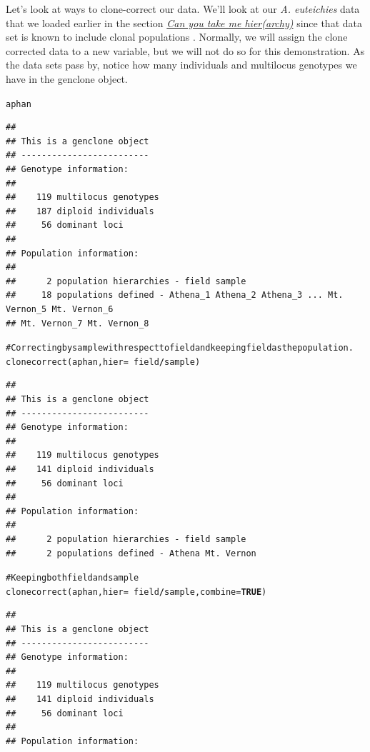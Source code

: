 \documentclass[letterpaper]{article}\usepackage[]{graphicx}\usepackage[]{color}
\makeatletter
\newcommand{\hlnum}[1]{\textcolor[rgb]{0.502,0,0.502}{\textbf{#1}}}%
\newcommand{\hlcom}[1]{\textcolor[rgb]{1,0.502,0}{#1}}%
\newcommand{\hlopt}[1]{\textcolor[rgb]{1,0,0.502}{\textbf{#1}}}%
\newcommand{\hlstd}[1]{\textcolor[rgb]{0,0,0}{#1}}%
\newcommand{\hlkwc}[1]{\textcolor[rgb]{0,0.502,0.753}{#1}}%
\newcommand{\hlkwd}[1]{\textcolor[rgb]{0,0.267,0.4}{#1}}%
\newenvironment{kframe}{%
 \def\at@end@of@kframe{}%
 \ifinner\ifhmode%
  \def\at@end@of@kframe{\end{minipage}}%
  \begin{minipage}{\columnwidth}%
 \fi\fi%
 \def\FrameCommand##1{\hskip\@totalleftmargin \hskip-\fboxsep
 \colorbox{shadecolor}{##1}\hskip-\fboxsep
     \hskip-\linewidth \hskip-\@totalleftmargin \hskip\columnwidth}%
 \MakeFramed {\advance\hsize-\width
   \@totalleftmargin\z@ \linewidth\hsize
   \@setminipage}}%
 {\par\unskip\endMakeFramed%
 \at@end@of@kframe}
\newenvironment{knitrout}{}{} %
\newcommand{\seclink}[2]{
  \textit{\hyperref[#1]{#2}}
}
\makeatother
\begin{document}
Let's look at ways to clone-correct our data. We'll look at our \textit{A. euteichies} 
data that we loaded earlier in the section \seclink{data.manip:hier}{Can you take
me hier(archy)} since that data set is known to include clonal populations 
\cite{Grunwald:2006}. Normally, we will assign the clone corrected data to a new
variable, but we will not do so for this demonstration. As the data sets pass by,
notice how many individuals and multilocus genotypes we have in the genclone
object.

\begin{knitrout}\footnotesize
{}\color{fgcolor}\begin{kframe}
\begin{alltt}
\hlstd{aphan}
\end{alltt}
\begin{verbatim}
## 
## This is a genclone object
## -------------------------
## Genotype information:
## 
##    119 multilocus genotypes
##    187 diploid individuals
##     56 dominant loci
## 
## Population information:
## 
##      2 population hierarchies - field sample
##     18 populations defined - Athena_1 Athena_2 Athena_3 ... Mt. Vernon_5 Mt. Vernon_6 
## Mt. Vernon_7 Mt. Vernon_8
\end{verbatim}
\begin{alltt}
\hlcom{# Correcting by sample with respect to field and keeping field as the population.}
\hlkwd{clonecorrect}\hlstd{(aphan,} \hlkwc{hier} \hlstd{=} \hlopt{~}\hlstd{field}\hlopt{/}\hlstd{sample)}
\end{alltt}
\begin{verbatim}
## 
## This is a genclone object
## -------------------------
## Genotype information:
## 
##    119 multilocus genotypes
##    141 diploid individuals
##     56 dominant loci
## 
## Population information:
## 
##      2 population hierarchies - field sample
##      2 populations defined - Athena Mt. Vernon
\end{verbatim}
\begin{alltt}
\hlcom{# Keeping both field and sample}
\hlkwd{clonecorrect}\hlstd{(aphan,} \hlkwc{hier} \hlstd{=} \hlopt{~}\hlstd{field}\hlopt{/}\hlstd{sample,} \hlkwc{combine} \hlstd{=} \hlnum{TRUE}\hlstd{)}
\end{alltt}
\begin{verbatim}
## 
## This is a genclone object
## -------------------------
## Genotype information:
## 
##    119 multilocus genotypes
##    141 diploid individuals
##     56 dominant loci
## 
## Population information:

\end{verbatim}
\end{kframe}
\end{knitrout}
\end{document}

